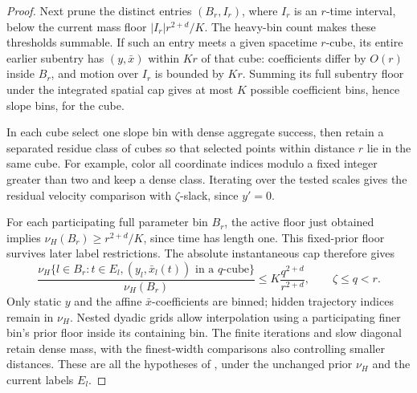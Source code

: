 \begin{proof}
Next prune the distinct entries \((B_r,I_r)\), where \(I_r\)
is an \(r\)-time interval, below the current mass floor
\(|I_r|r^{2+d}/K\). The heavy-bin count makes these thresholds
summable. If such an entry meets a given spacetime \(r\)-cube,
its entire earlier subentry has \((y,\bar x)\) within \(Kr\)
of that cube: coefficients differ by \(O(r)\) inside \(B_r\),
and motion over \(I_r\) is bounded by \(Kr\). Summing its full
subentry floor under the integrated spatial cap gives at most
\(K\) possible coefficient bins, hence slope bins, for the cube.

In each cube select one slope bin with dense aggregate success,
then retain a separated residue class of cubes so that selected
points within distance \(r\) lie in the same cube. For example,
color all coordinate indices modulo a fixed integer greater than
two and keep a dense class. Iterating over the tested scales gives
the residual velocity comparison with \(\zeta\)-slack, since
\(y'=0\).

For each participating full parameter bin \(B_r\), the active
floor just obtained implies \(\nu_H(B_r)\ge r^{2+d}/K\),
since time has length one. This fixed-prior floor survives later
label restrictions. The absolute instantaneous cap therefore gives
\[
 \frac{\nu_H\{l\in B_r:t\in E_l,
                   (y_l,\bar x_l(t))\text{ in a }q\text{-cube}\}}
      {\nu_H(B_r)}
 \le K\frac{q^{2+d}}{r^{2+d}},\qquad \zeta\le q<r.
\]
Only static \(y\) and the affine \(\bar x\)-coefficients are
binned; hidden trajectory indices remain in \(\nu_H\). Nested
dyadic grids allow interpolation using a participating finer bin's
prior floor inside its containing bin. The finite iterations and
slow diagonal retain dense mass, with the finest-width comparisons
also controlling smaller distances. These are all the hypotheses
of , under the unchanged prior \(\nu_H\)
and the current labels \(E_l\).


\end{proof}
